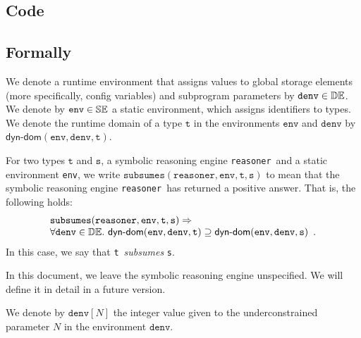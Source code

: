 \documentclass{book}
\newcommand\dynamicdomain[0]{\textsf{dyn-dom}}
\newcommand\tenv[0]{\texttt{env}}
\newcommand\vt[0]{\texttt{t}}
\newcommand\vs[0]{\texttt{s}}
\begin{document}
  \subsection{Code}

\begin{emptyformal}
      \subsection{Formally}
      \newcommand\denv[0]{\texttt{denv}}

      \newcommand\subsumes[0]{\texttt{subsumes}}
      \newcommand\reasoner[0]{\texttt{reasoner}}

      We denote a runtime environment that assigns values to global storage elements (more specifically, config variables)
      and subprogram parameters by $\denv \in \dynamicenvs$.
      We denote by $\tenv \in \staticenvs$ a static environment, which assigns identifiers to types.
      We denote the runtime domain of a type $\vt$ in the environments $\tenv$ and $\denv$ by $\dynamicdomain(\tenv, \denv, \vt)$.

      For two types $\vt$ and $\vs$, a symbolic reasoning engine \reasoner\ and a static environment \tenv,
      we write $\subsumes(\reasoner, \tenv, \vt, \vs)$ to mean that the symbolic reasoning
      engine \reasoner\ has returned a positive answer. That is, the following holds:
      \[
        \begin{array}{l}
        \subsumes(\reasoner, \tenv, \vt, \vs) \Rightarrow \\
       \forall \denv\in\dynamicenvs.\ \dynamicdomain(\tenv, \denv, \vt) \supseteq \dynamicdomain(\tenv, \denv, \vs) \enspace.
        \end{array}
      \]
      In this case, we say that \vt\ \emph{subsumes} \vs.

      In this document, we leave the symbolic reasoning engine unspecified. We will define it in detail in a future version.

We denote by $\denv[N]$ the integer value given to the underconstrained parameter $N$ in the environment $\denv$.


\end{emptyformal}
\end{document}
